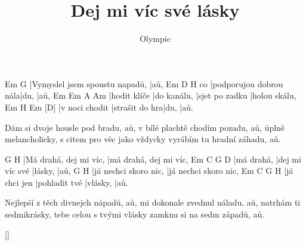 \documentclass{song}
\title{Dej mi víc své lásky}
\author{Olympic}
\begin{document}
\strophe
Em                             G
|Vymyslel jsem spoustu napadů, |aů,
   Em                     D    H\7
co |podporujou dobrou nála|du, |aů,
Em           Em\7        A              Am
|hodit klíče |do kanálu, |sjet po zadku |holou skálu,
Em             H\7            Em   [D]
|v noci chodit |strašit do hra|du, |aů.
\endstrophe

\strophe*
Dám si dvoje housle pod bradu, aů,
v bílé plachtě chodím pozadu, aů,
úplně melancholicky, s citem pro věc jako vždycky
vyrábím tu hradní záhadu, aů.
\endstrophe

G                      H\7
|Má drahá, dej mi víc, |má drahá, dej mi víc,
Em         C               G       D
|má drahá, |dej mi víc své |lásky, |aů,
G                     H\7
|já nechci skoro nic, |já nechci skoro nic,
Em           C             G        H\7
|já chci jen |pohladit tvé |vlásky, |aů.
\endstrophe

\strophe*
Nejlepší z těch divnejch nápadů, aů,
mi dokonale zvednul náladu, aů,
natrhám ti sedmikrásky, tebe celou s tvými vlásky
zamknu si na sedm západů, aů.
\endstrophe

\ref{}
\end{document}
